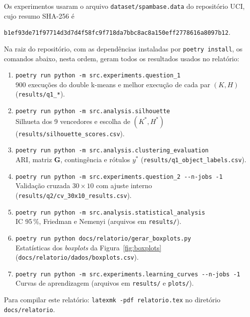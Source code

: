 \documentclass[11pt,a4paper]{article}
\begin{document}
Os experimentos usaram o arquivo \texttt{dataset/spambase.data} do repositório UCI, cujo resumo SHA-256 é
\begin{center}
\small\texttt{b1ef93de71f97714d3d7d4f58fc9f718da7bbc8ac8a150eff2778616a8097b12}.
\end{center}
Na raiz do repositório, com as dependências instaladas por \texttt{poetry install}, os comandos abaixo, nesta
ordem, geram todos os resultados usados no relatório:

\begin{enumerate}[leftmargin=*]
\item \texttt{poetry run python -m src.experiments.question\_1}\\
  900 execuções do double k-means e melhor execução de cada par $(K,H)$ (\texttt{results/q1\_*}).
\item \texttt{poetry run python -m src.analysis.silhouette}\\
  Silhueta dos 9 vencedores e escolha de $(K^*,H^*)$ (\texttt{results/silhouette\_scores.csv}).
\item \texttt{poetry run python -m src.analysis.clustering\_evaluation}\\
  ARI, matriz $\mathbf{G}$, contingência e rótulos $y^*$ (\texttt{results/q1\_object\_labels.csv}).
\item \texttt{poetry run python -m src.experiments.question\_2 -{}-n-jobs -1}\\
  Validação cruzada $30\times10$ com ajuste interno (\texttt{results/q2/cv\_30x10\_results.csv}).
\item \texttt{poetry run python -m src.analysis.statistical\_analysis}\\
  IC 95\,\%, Friedman e Nemenyi (arquivos em \texttt{results/}).
\item \texttt{poetry run python docs/relatorio/gerar\_boxplots.py}\\
  Estatísticas dos \textit{boxplots} da Figura~\ref{fig:boxplots} (\texttt{docs/relatorio/dados/boxplots.csv}).
\item \texttt{poetry run python -m src.experiments.learning\_curves -{}-n-jobs -1}\\
  Curvas de aprendizagem (arquivos em \texttt{results/} e \texttt{plots/}).
\end{enumerate}

Para compilar este relatório: \texttt{latexmk -pdf relatorio.tex} no diretório \texttt{docs/relatorio}.
\end{document}

